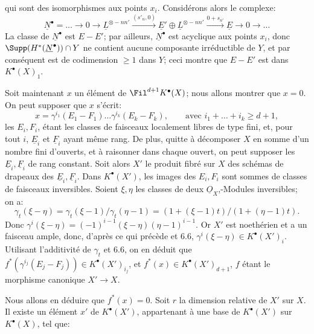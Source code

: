 
qui
sont des isomorphismes aux points $x_i$. Considérons alors le complexe:
\[
  \underline{N}^\bullet=\ldots\to0\to \underline{L}^{\otimes -nn'}
    \xrightarrow{(s'_n,0)} \underline{E}'\oplus \underline{L}^{\otimes -nn'}
    \xrightarrow{0+s_{n'}} \underline{E}\to0\to\ldots
\]
La classe de $\underline{N}^\bullet$ est $E-E'$; par ailleurs, $\underline{N}^\bullet$ est acyclique aux points $x_i$, donc $\Supp(H^*(\underline{N}^\bullet))\cap Y$ ne contient aucune composante irréductible de $Y$, et par conséquent est de codimension $\ge1$ dans $Y$; ceci montre que $E-E'$ est dans $K^{\bullet}(X)_1$.

Soit maintenant $x$ un élément de $\Fil^{d+1}K^{\bullet}(X)$; nous allons montrer que $x=0$. On peut supposer que $x$ s'écrit:
\[
  x=\gamma^{i_1}(E_1-F_1)\ldots\gamma^{i_k}(E_k-F_k),
  \qquad\text{avec } i_1+\ldots+i_k\ge d+1,
\]
les $E_i,F_i$, étant les classes de faisceaux localement libres de type fini, et, pour tout $i$, $\underline{E}_i$ et $\underline{F}_i$ ayant même rang. De plus, quitte à décomposer $X$ en somme d'un nombre fini d'ouverts, et à raisonner dans chaque ouvert, on peut supposer les $\underline{E}_i,\underline{F}_i$ de rang constant. Soit alors $X'$ le produit fibré sur $X$ des schémas de drapeaux des $\underline{E}_i,\underline{F}_i$. Dans $K^{\bullet}(X')$, les images des $E_i,F_i$ sont sommes de classes de faisceaux inversibles. Soient $\xi,\eta$ les classes de deux $\underline{O}_X$,-Modules inversibles; on a:
\[
  \gamma_t(\xi-\eta)=\gamma_t(\xi-1)/\gamma_t(\eta-1)
  =(1+(\xi-1)t)/(1+(\eta-1)t).
\]
Donc $\gamma^i(\xi-\eta)=(-1)^{i-1}(\xi-\eta)(\eta-1)^{i-1}$. Or $X'$ est noethérien et a un faisceau ample, donc, d'après ce qui précède et 6.6, $\gamma^i(\xi-\eta)\in K^{\bullet}(X')_i$. Utilisant l'additivité de $\gamma_t$ et 6.6, on en déduit que $f^*(\gamma^{i_j}(E_j-F_j))\in K^{\bullet}(X')_{i_j}$, et $f^*(x)\in K^{\bullet}(X')_{d+1}$, $f$ étant le morphisme canonique $X'\to X$.

Nous allons en déduire que $f^*(x)=0$. Soit $r$ la dimension relative de $X'$ sur $X$. Il existe un élément $x'$ de $K^{\bullet}(X')$, appartenant à une base de $K^{\bullet}(X')$ sur $K^{\bullet}(X)$, tel que:
